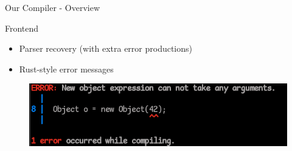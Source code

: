 \documentclass[en,16:9]{sdqbeamer}
\begin{document}
\begin{frame}{Our Compiler - Overview}
	\begin{figure}
		\centering
		
	\end{figure}
\end{frame}

\begin{frame}{Frontend}
	\begin{itemize}
		\item Parser recovery (with extra error productions)
		\item Rust-style error messages
	\end{itemize}

	\begin{figure}
		\centering
		\includegraphics{images/error_message.png}
	\end{figure}
\end{frame}
\end{document}
